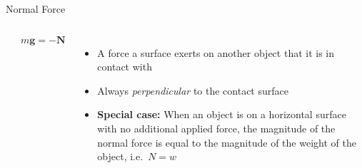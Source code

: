 \documentclass[12pt,compress,aspectratio=169]{beamer}
\begin{document}
\begin{frame}{Normal Force}
  \begin{columns}
    \begin{center}
    \end{center}
    \begin{displaymath}
      m\bm{g}=-\bm{N}
    \end{displaymath}
    
    \begin{itemize}
    \item A force a surface exerts on another object that it is in contact with
    \item Always \emph{perpendicular} to the contact surface
    \item\textbf{Special case:} When an object is on a horizontal surface
      with no additional applied force, the magnitude of the normal force is
      equal to the magnitude of the weight of the object, i.e.\ $N=w$
    \end{itemize}
  \end{columns}
\end{frame}
\end{document}
